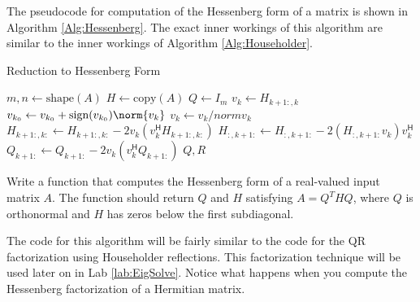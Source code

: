 The pseudocode for computation of the Hessenberg form of a matrix is shown in Algorithm \ref{Alg:Hessenberg}.
The exact inner workings of this algorithm are similar to the inner workings of Algorithm \ref{Alg:Householder}.

\begin{algorithm}
\caption{Reduction to Hessenberg Form}
\label{Alg:Hessenberg}
\begin{algorithmic}[1]
\State $m, n \gets \text{shape}(A)$
\State $H \gets \text{copy}(A)$
\State $Q \gets I_m$
    \State $v_k \gets H_{k+1:, k}$
    \State $v_{k_0} \gets v_{k_0} + \text{sign}(v_{k_0}) \norm{v_k}$
    \State $v_k \gets v_k/norm{v_k}$
    \State $H_{k+1:,k:} \gets H_{k+1:,k:} - 2v_k(v_k^\mathsf{H} H_{k+1:,k:})$
    \State $H_{:,k+1:} \gets H_{:,k+1:} - 2(H_{:,k+1:} v_k) v_k^\mathsf{H}$
    \State $Q_{k+1:} \gets Q_{k+1:} - 2v_k(v_k^\mathsf{H} Q_{k+1:})$
\EndFor
\State {} $Q, R$
\EndProcedure
\end{algorithmic}
\end{algorithm}

\begin{problem}
\label{prob:hessenberg}
Write a function  that computes the Hessenberg form of a real-valued
input matrix $A$. The function should return $Q$ and $H$ satisfying $A = Q^THQ$,
where $Q$ is orthonormal and $H$ has zeros below the first subdiagonal.

The code for this algorithm will be fairly similar to the code for the QR factorization using Householder reflections.
This factorization technique will be used later on in Lab \ref{lab:EigSolve}.
Notice what happens when you compute the Hessenberg factorization of a Hermitian matrix.
\end{problem}

